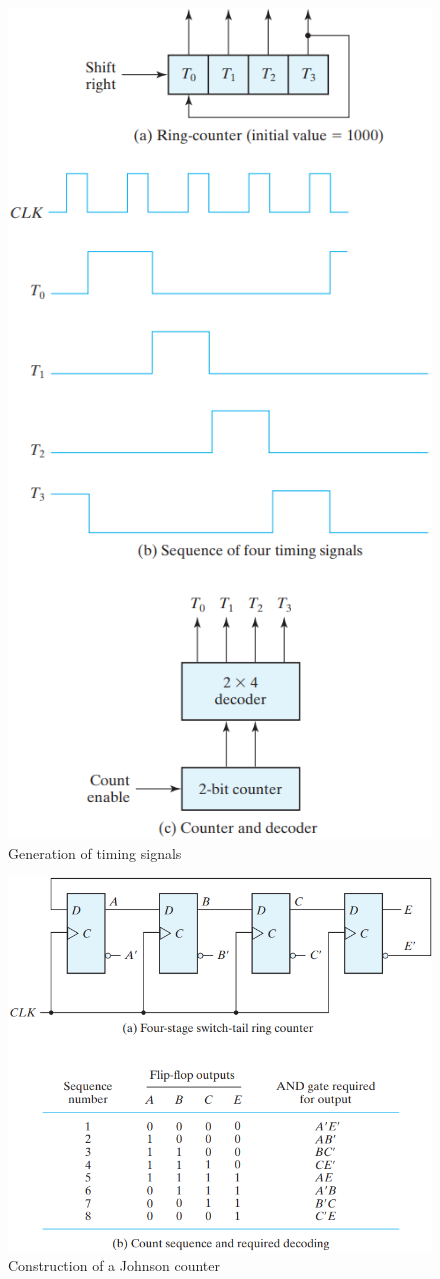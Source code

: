 \begin{figure}[H]
  \centering
  \includegraphics[width=.9\linewidth]{img/fig-6.17.png}
  \caption{Generation of timing signals}
  \label{fig:6.17}
\end{figure}

\begin{figure}[H]
  \centering
  \includegraphics[width=.9\linewidth]{img/fig-6.18.png}
  \caption{Construction of a Johnson counter}
  \label{fig:6.18}
\end{figure}
